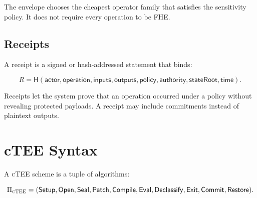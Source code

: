 \documentclass[11pt]{article}
\newcommand{\ctee}{\textnormal{\textsc{cTEE}}}
\newcommand{\hash}{\ensuremath{\mathsf{H}}}
\begin{document}
The envelope chooses the cheapest operator family that satisfies the sensitivity
policy. It does not require every operation to be FHE.

\subsection{Receipts}

A receipt is a signed or hash-addressed statement that binds:

\[
R = \hash(\mathsf{actor}, \mathsf{operation}, \mathsf{inputs},
\mathsf{outputs}, \mathsf{policy}, \mathsf{authority}, \mathsf{stateRoot},
\mathsf{time}).
\]

Receipts let the system prove that an operation occurred under a policy without
revealing protected payloads. A receipt may include commitments instead of
plaintext outputs.

\section{cTEE Syntax}

A \ctee{} scheme is a tuple of algorithms:

\[
\Pi_{\ctee} =
(\mathsf{Setup}, \mathsf{Open}, \mathsf{Seal}, \mathsf{Patch},
\mathsf{Compile}, \mathsf{Eval}, \mathsf{Declassify},
\mathsf{Exit}, \mathsf{Commit}, \mathsf{Restore}).
\]
\end{document}
